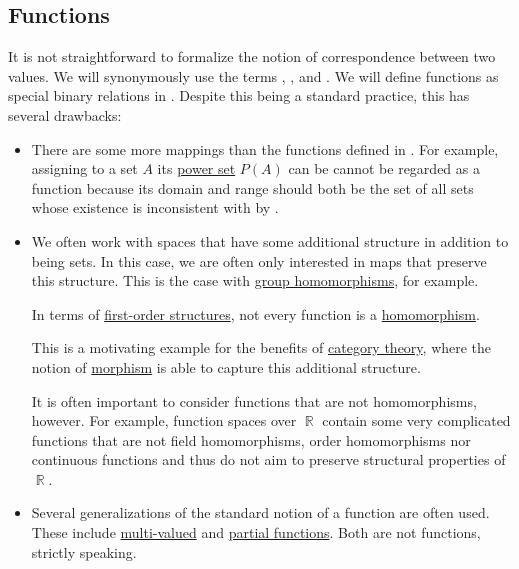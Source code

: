 \subsection{Functions}\label{subsec:functions}

\begin{remark}\label{rem:function_definition}
  It is not straightforward to formalize the notion of correspondence between two values. We will synonymously use the terms , ,  and . We will define functions as special binary relations in . Despite this being a standard practice, this has several drawbacks:

  \begin{itemize}
    \item There are some more mappings than the functions defined in . For example, assigning to a set \( A \) its \hyperref[def:basic_set_operations/power_set]{power set} \( P(A) \) can be cannot be regarded as a function because its domain and range should both be the set of all sets whose existence is inconsistent with \hyperref[def:zfc]{} by .

    \item We often work with spaces that have some additional structure in addition to being sets. In this case, we are often only interested in maps that preserve this structure. This is the case with \hyperref[def:group/homomorphism]{group homomorphisms}, for example.

    In terms of \hyperref[def:first_order_structure]{first-order structures}, not every function is a \hyperref[def:first_order_homomorphism]{homomorphism}.

    This is a motivating example for the benefits of \hyperref[sec:category_theory]{category theory}, where the notion of \hyperref[def:category/morphisms]{morphism} is able to capture this additional structure.

    It is often important to consider functions that are not homomorphisms, however. For example, function spaces over \( \BbbR \) contain some very complicated functions that are not field homomorphisms, order homomorphisms nor continuous functions and thus do not aim to preserve structural properties of \( \BbbR \).

    \item Several generalizations of the standard notion of a function are often used. These include \hyperref[def:multi_valued_function]{multi-valued} and \hyperref[def:partial_function]{partial functions}. Both are not functions, strictly speaking.


\end{itemize}
\end{remark}
